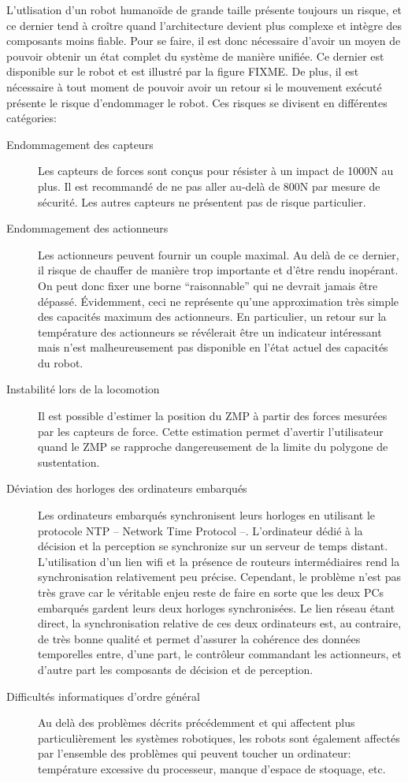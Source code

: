 L'utlisation d'un robot humanoïde de grande taille présente toujours
un risque, et ce dernier tend à croître quand l'architecture devient
plus complexe et intègre des composants moins fiable. Pour se faire,
il est donc nécessaire d'avoir un moyen de pouvoir obtenir un état
complet du système de manière unifiée. Ce dernier est disponible sur
le robot et est illustré par la figure FIXME. De plus, il est
nécessaire à tout moment de pouvoir avoir un retour si le mouvement
exécuté présente le risque d'endommager le robot. Ces risques se
divisent en différentes catégories:
\begin{description}
\item[Endommagement des capteurs] Les capteurs de forces sont conçus
  pour résister à un impact de 1000N au plus. Il est recommandé de ne
  pas aller au-delà de 800N par mesure de sécurité. Les autres
  capteurs ne présentent pas de risque particulier.
\item[Endommagement des actionneurs] Les actionneurs peuvent fournir
  un couple maximal. Au delà de ce dernier, il risque de chauffer de
  manière trop importante et d'être rendu inopérant. On peut donc
  fixer une borne ``raisonnable'' qui ne devrait jamais être
  dépassé. Évidemment, ceci ne représente qu'une approximation très
  simple des capacités maximum des actionneurs. En particulier, un
  retour sur la température des actionneurs se révélerait être un
  indicateur intéressant mais n'est malheureusement pas disponible en
  l'état actuel des capacités du robot.
\item[Instabilité lors de la locomotion] Il est possible d'estimer la
  position du ZMP à partir des forces mesurées par les capteurs de
  force. Cette estimation permet d'avertir l'utilisateur quand le ZMP
  se rapproche dangereusement de la limite du polygone de
  sustentation.
\item[Déviation des horloges des ordinateurs embarqués] Les
  ordinateurs embarqués synchronisent leurs horloges en utilisant le
  protocole NTP -- Network Time Protocol --. L'ordinateur dédié à la
  décision et la perception se synchronize sur un serveur de temps
  distant. L'utilisation d'un lien wifi et la présence de routeurs
  intermédiaires rend la synchronisation relativement peu
  précise. Cependant, le problème n'est pas très grave car le
  véritable enjeu reste de faire en sorte que les deux PCs embarqués
  gardent leurs deux horloges synchronisées. Le lien réseau étant
  direct, la synchronisation relative de ces deux ordinateurs est, au
  contraire, de très bonne qualité et permet d'assurer la cohérence
  des données temporelles entre, d'une part, le contrôleur commandant
  les actionneurs, et d'autre part les composants de décision et de
  perception.
\item[Difficultés informatiques d'ordre général] Au delà des problèmes
  décrits précédemment et qui affectent plus particulièrement les
  systèmes robotiques, les robots sont également affectés par
  l'ensemble des problèmes qui peuvent toucher un ordinateur:
  température excessive du processeur, manque d'espace de stoquage,
  etc.
\end{description}


